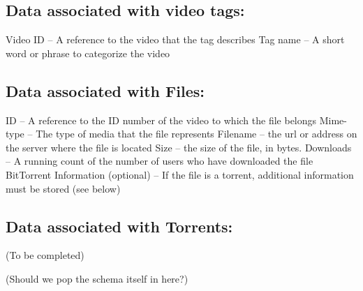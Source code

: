 \documentclass[a4paper,12pt]{report}
\begin{document}
\subsection{Data associated with video tags:}
	Video ID – A reference to the video that the tag describes
	Tag name – A short word or phrase to categorize the video

\subsection{Data associated with Files:}
	ID – A reference to the ID number of the video to which the file belongs
	Mime-type – The type of media that the file represents
	Filename – the url or address on the server where the file is located
	Size – the size of the file, in bytes.
	Downloads – A running count of the number of users who have downloaded the 		file
	BitTorrent Information (optional) – If the file is a torrent, additional information 		must be stored (see below)

\subsection{Data associated with Torrents:}
	(To be completed)

(Should we pop the schema itself in here?)
\end{document}
